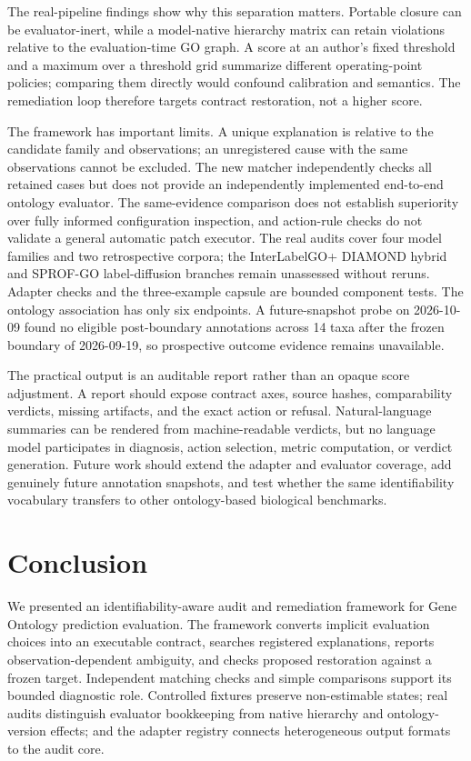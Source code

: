 \documentclass[11pt]{article}
\begin{document}
The real-pipeline findings show why this separation matters. Portable closure can be evaluator-inert, while a model-native hierarchy matrix can retain violations relative to the evaluation-time GO graph. A score at an author's fixed threshold and a maximum over a threshold grid summarize different operating-point policies; comparing them directly would confound calibration and semantics. The remediation loop therefore targets contract restoration, not a higher score.

The framework has important limits. A unique explanation is relative to the candidate family and observations; an unregistered cause with the same observations cannot be excluded. The new matcher independently checks all retained cases but does not provide an independently implemented end-to-end ontology evaluator. The same-evidence comparison does not establish superiority over fully informed configuration inspection, and action-rule checks do not validate a general automatic patch executor. The real audits cover four model families and two retrospective corpora; the InterLabelGO+ DIAMOND hybrid and SPROF-GO label-diffusion branches remain unassessed without reruns. Adapter checks and the three-example capsule are bounded component tests. The ontology association has only six endpoints. A future-snapshot probe on 2026-10-09 found no eligible post-boundary annotations across 14 taxa after the frozen boundary of 2026-09-19, so prospective outcome evidence remains unavailable.

The practical output is an auditable report rather than an opaque score adjustment. A report should expose contract axes, source hashes, comparability verdicts, missing artifacts, and the exact action or refusal. Natural-language summaries can be rendered from machine-readable verdicts, but no language model participates in diagnosis, action selection, metric computation, or verdict generation. Future work should extend the adapter and evaluator coverage, add genuinely future annotation snapshots, and test whether the same identifiability vocabulary transfers to other ontology-based biological benchmarks.

\section{Conclusion}

We presented an identifiability-aware audit and remediation framework for Gene Ontology prediction evaluation. The framework converts implicit evaluation choices into an executable contract, searches registered explanations, reports observation-dependent ambiguity, and checks proposed restoration against a frozen target. Independent matching checks and simple comparisons support its bounded diagnostic role. Controlled fixtures preserve non-estimable states; real audits distinguish evaluator bookkeeping from native hierarchy and ontology-version effects; and the adapter registry connects heterogeneous output formats to the audit core.
\end{document}
